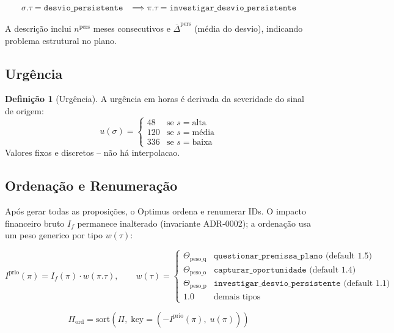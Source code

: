 \documentclass[a4paper, 12pt]{report}
\theoremstyle{definition}
\newtheorem{definicao}{Defini\c{c}\~ao}[chapter]
\theoremstyle{remark}
\begin{document}
\begin{align}
  \sigma.\tau = \texttt{desvio\_persistente} &\implies
  \pi.\tau = \texttt{investigar\_desvio\_persistente}
\end{align}

A descri\c{c}\~ao inclui $n^{\text{pers}}$ meses consecutivos e
$\overline{\Delta}^{\text{pers}}$ (m\'edia do desvio), indicando
problema estrutural no plano.


\subsection{Urg\^encia}

\begin{definicao}[Urg\^encia]
  A urg\^encia em horas \'e derivada da severidade do sinal de origem:
  \[
    u(\sigma) = \begin{cases}
      48 & \text{se } s = \text{alta} \\
      120 & \text{se } s = \text{m\'edia} \\
      336 & \text{se } s = \text{baixa}
    \end{cases}
  \]
  Valores fixos e discretos -- n\~ao h\'a interpolacao.
\end{definicao}


\subsection{Ordena\c{c}\~ao e Renumera\c{c}\~ao}

Ap\'os gerar todas as proposi\c{c}\~oes, o Optimus ordena e renumerar IDs.
O impacto financeiro bruto $I_f$ permanece inalterado (invariante
ADR-0002); a ordena\c{c}\~ao usa um peso generico por tipo $w(\tau)$:

\[
  I^{\text{prio}}(\pi) = I_f(\pi) \cdot w(\pi.\tau),
  \qquad
  w(\tau) = \begin{cases}
    \Theta_{\text{peso\_q}} & \texttt{questionar\_premissa\_plano}
      \text{ (default }1.5\text{)} \\
    \Theta_{\text{peso\_o}} & \texttt{capturar\_oportunidade}
      \text{ (default }1.4\text{)} \\
    \Theta_{\text{peso\_p}} & \texttt{investigar\_desvio\_persistente}
      \text{ (default }1.1\text{)} \\
    1.0 & \text{demais tipos}
  \end{cases}
\]

\[
  \Pi_{\text{ord}} = \text{sort}\left(\Pi,\;
    \text{key} = \left(-I^{\text{prio}}(\pi),\; u(\pi)\right)\right)
\]
\end{document}
